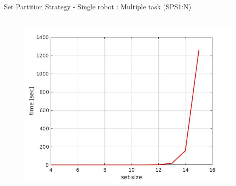 \begin{frame}[fragile]{Set Partition Strategy - Single robot : Multiple task (SPS1:N)}
\begin{columns}
\begin{column}{.4\textwidth}
\begin{figure}
               \includegraphics[width=\textwidth]{img/exp}
           \end{figure}
           \end{column}
       \end{columns}
   \end{frame}

